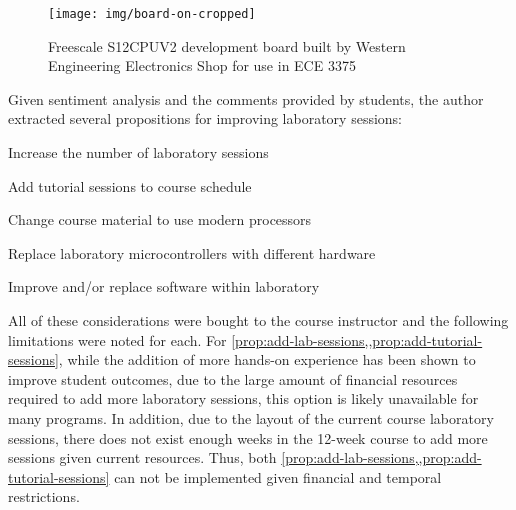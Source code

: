 \begin{figure}[!hb]
    \centering
    \texttt{[image: img/board-on-cropped]}
    \caption{Freescale S12CPUV2 development board built by Western Engineering Electronics Shop for use in ECE 3375}
    \label{fig:hc12-board}
\end{figure}

Given sentiment analysis and the comments provided by students, the author extracted several propositions for improving laboratory sessions: 

\begin{propositions}%
    \item Increase the number of laboratory sessions 
        \label{prop:add-lab-sessions}
    \item Add tutorial sessions to course schedule
        \label{prop:add-tutorial-sessions}
    \item Change course material to use modern processors
        \label{prop:change-course-materials}
    \item Replace laboratory microcontrollers with different hardware
        \label{prop:replace-hardware} %
    \item Improve and/or replace software within laboratory
        \label{prop:replace-software}
\end{propositions}

All of these considerations were bought to the course instructor and the following limitations were noted for each. For \cref{prop:add-lab-sessions,,prop:add-tutorial-sessions}, while the addition of more hands-on experience has been shown to improve student outcomes\cite{Ristov2011, Stolikj2011}, due to the large amount of financial resources required to add more laboratory sessions, this option is likely unavailable for many programs. In addition, due to the layout of the current course laboratory sessions, there does not exist enough weeks in the 12-week course to add more sessions given current resources. Thus, both \cref{prop:add-lab-sessions,,prop:add-tutorial-sessions} can not be implemented given financial and temporal restrictions.

